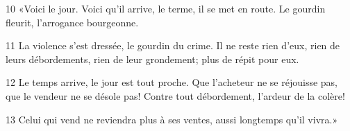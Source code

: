 
10 «Voici le jour. Voici qu’il arrive, le terme, il se met en route. Le gourdin fleurit, l’arrogance bourgeonne.

11 La violence s’est dressée, le gourdin du crime. Il ne reste rien d’eux, rien de leurs débordements, rien de leur grondement; plus de répit pour eux.

12 Le temps arrive, le jour est tout proche. Que l’acheteur ne se réjouisse pas, que le vendeur ne se désole pas! Contre tout débordement, l’ardeur de la colère!

13 Celui qui vend ne reviendra plus à ses ventes, aussi longtemps qu’il vivra.»